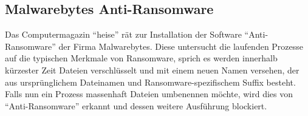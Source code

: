 \subsection{Malwarebytes Anti-Ransomware}

	Das Computermagazin ``heise'' rät zur Installation der Software ``Anti-Ransomware'' der Firma Malwarebytes. Diese untersucht die laufenden Prozesse auf die typischen Merkmale von Ransomware, sprich es werden innerhalb kürzester Zeit Dateien verschlüsselt und mit einem neuen Namen versehen, der aus ursprünglichem Dateinamen und Ransomware-spezifischem Suffix besteht. Falls nun ein Prozess massenhaft Dateien umbenennen möchte, wird dies von ``Anti-Ransomware'' erkannt und dessen weitere Ausführung blockiert\cite{malwarebytes}.

